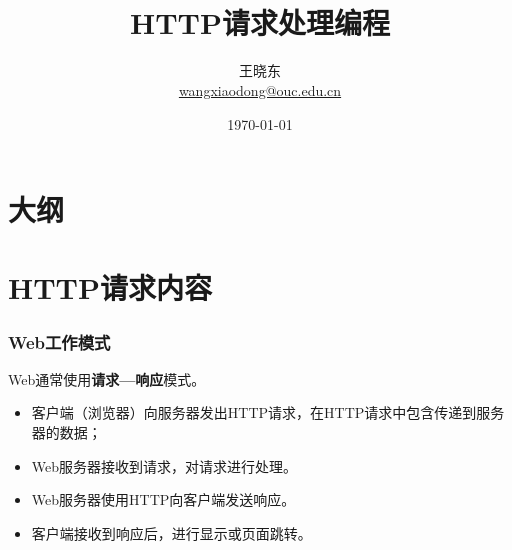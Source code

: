 
\title[KevinW@OUC]{\\  
HTTP请求处理编程}
\author[王晓东]{王晓东\\
  \href{mailto:wangxiaodong@ouc.edu.cn}{\footnotesize wangxiaodong@ouc.edu.cn}}
\date{\today}


 \frame{\titlepage}

\section*{大纲}

\section{HTTP请求内容}

\begin{frame}[fragile] %
  \frametitle{Web工作模式}

  Web通常使用{\bf\Red 请求—响应}模式。

  \begin{itemize}\kai
  \item 客户端（浏览器）向服务器发出HTTP请求，在HTTP请求中包含传递到服务器的数据；
  \item Web服务器接收到请求，对请求进行处理。
  \item Web服务器使用HTTP向客户端发送响应。
  \item 客户端接收到响应后，进行显示或页面跳转。
  \end{itemize}
\end{frame}

